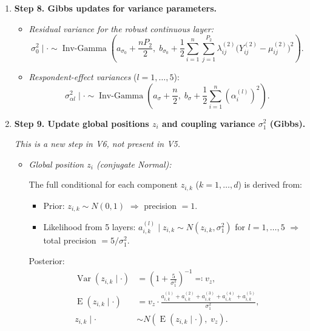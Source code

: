 \documentclass[11pt]{article}
\begin{document}
\begin{enumerate}[leftmargin=1.8em]
    \item \textbf{Step 8. Gibbs updates for variance parameters.}

    \begin{itemize}[leftmargin=1.5em]
        \item[(a)] \textit{Residual variance for the robust continuous layer:}
        \[
        \sigma_0^2\mid \cdot
        \sim
        \operatorname{Inv\text{-}Gamma}
        \left(
        a_{\sigma_0}+\frac{nP_2}{2},\;
        b_{\sigma_0}+\frac{1}{2}\sum_{i=1}^{n}\sum_{j=1}^{P_2}\lambda_{ij}^{(2)}\bigl(Y_{ij}^{(2)}-\mu_{ij}^{(2)}\bigr)^2
        \right).
        \]

        \item[(b)] \textit{Respondent-effect variances} ($l=1,\dots,5$):
        \[
        \sigma_{\alpha l}^2\mid \cdot
        \sim
        \operatorname{Inv\text{-}Gamma}
        \left(
        a_\sigma+\frac{n}{2},\;
        b_\sigma+\frac{1}{2}\sum_{i=1}^{n}(\alpha_i^{(l)})^2
        \right).
        \]
    \end{itemize}

    \item \textbf{Step 9. Update global positions $z_i$ and coupling variance $\sigma_1^2$ (Gibbs).}

    \textit{This is a new step in V6, not present in V5.}

    \begin{itemize}[leftmargin=1.5em]
        \item[(a)] \textit{Global position $z_i$ (conjugate Normal):}

        The full conditional for each component $z_{i,k}$ ($k=1,\dots,d$) is derived from:
        \begin{itemize}[leftmargin=1em]
            \item Prior: $z_{i,k} \sim N(0, 1)$ $\Rightarrow$ precision $= 1$.
            \item Likelihood from 5 layers: $a_{i,k}^{(l)} \mid z_{i,k} \sim N(z_{i,k}, \sigma_1^2)$ for $l=1,\dots,5$ $\Rightarrow$ total precision $= 5/\sigma_1^2$.
        \end{itemize}
        Posterior:
        \begin{align*}
        \operatorname{Var}(z_{i,k}\mid \cdot) &= \left(1 + \frac{5}{\sigma_1^2}\right)^{-1} \eqqcolon v_z, \\
        \operatorname{E}(z_{i,k}\mid \cdot) &= v_z \cdot \frac{a_{i,k}^{(1)} + a_{i,k}^{(2)} + a_{i,k}^{(3)} + a_{i,k}^{(4)} + a_{i,k}^{(5)}}{\sigma_1^2}, \\
        z_{i,k}\mid \cdot &\sim N\!\left(\operatorname{E}(z_{i,k}\mid \cdot),\; v_z\right).
        \end{align*}


\end{itemize}
\end{enumerate}
\end{document}
